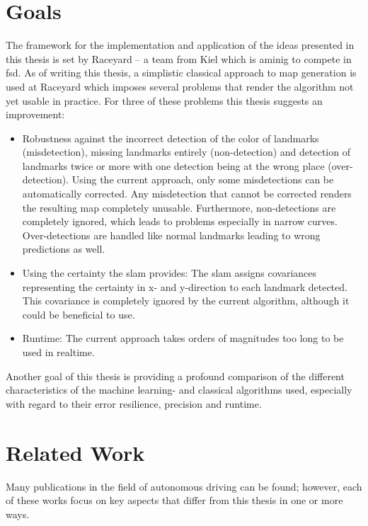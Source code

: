 


\section{Goals}
The framework for the implementation and application of the ideas presented in this thesis is set by Raceyard – a team from Kiel which is aminig to compete in \ac{fsd}. As of writing this thesis, a simplistic classical approach to map generation is used at Raceyard which imposes several problems that render the algorithm not yet usable in practice. For three of these problems this thesis suggests an improvement:

\begin{itemize}
    \item Robustness against the incorrect detection of the color of landmarks (misdetection), missing landmarks entirely (non-detection) and detection of landmarks twice or more with one detection being at the wrong place (over-detection). Using the current approach, only some misdetections can be automatically corrected. Any misdetection that cannot be corrected renders the resulting map completely unusable. Furthermore, non-detections are completely ignored, which leads to problems especially in narrow curves. Over-detections are handled like normal landmarks leading to wrong predictions as well.
    \item Using the certainty the \ac{slam} provides: The \ac{slam} assigns covariances representing the certainty in x- and y-direction to each landmark detected. This covariance is completely ignored by the current algorithm, although it could be beneficial to use.
    \item Runtime: The current approach takes orders of magnitudes too long to be used in realtime.
\end{itemize}
Another goal of this thesis is providing a profound comparison of the different characteristics of the machine learning- and classical algorithms used, especially with regard to their error resilience, precision and runtime.

\section{Related Work}
Many publications in the field of autonomous driving can be found; however, each of these works focus on key aspects that differ from this thesis in one or more ways. 

